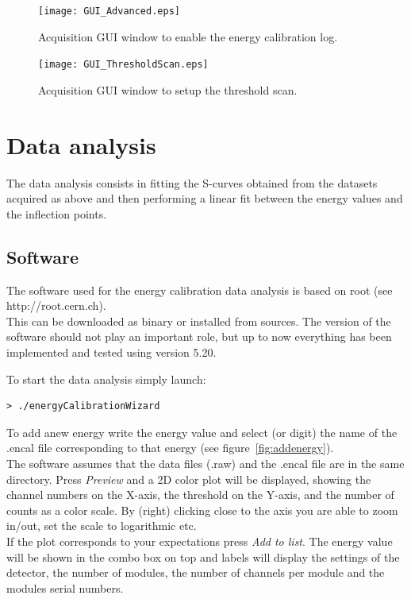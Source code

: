 \begin{figure}
\caption{Acquisition GUI window to enable the energy calibration log.} \label{fig:guiencallog}
\texttt{[image: GUI\_Advanced.eps]}
\end{figure} 

\begin{figure}
\caption{Acquisition GUI window to setup the threshold scan.} \label{fig:guithrscan}
\texttt{[image: GUI\_ThresholdScan.eps]}
\end{figure} 
\newpage

\section{Data analysis}

The data analysis consists in fitting the S-curves obtained from the datasets acquired as above and then performing a linear fit between the energy values and the inflection points.

\subsection{Software}

The software used for the energy calibration data analysis is based on root (see http://root.cern.ch).\\
This can be downloaded as binary or installed from sources. The version of the software should not play an important role, but up to now everything has been implemented and tested using version 5.20.

To start the data analysis simply launch:
\begin{verbatim}
> ./energyCalibrationWizard 
\end{verbatim}

To add anew energy write the energy value and select (or digit) the name of the .encal file corresponding to that energy (see figure~\ref{fig:addenergy}).\\
The software assumes that the data files (.raw) and the .encal file are in the same directory.
Press  \textit{Preview} and a 2D color plot will be displayed, showing the channel numbers on the X-axis, the threshold on the Y-axis, and the number of counts as a color scale.
By (right) clicking close to the axis you are able to zoom in/out, set the scale to logarithmic etc.\\
If the plot corresponds to your expectations press \textit{Add to list}. The energy value will be shown in the combo box on top and labels will display the settings of the detector, the number of modules, the number of channels per module and the modules serial numbers.

